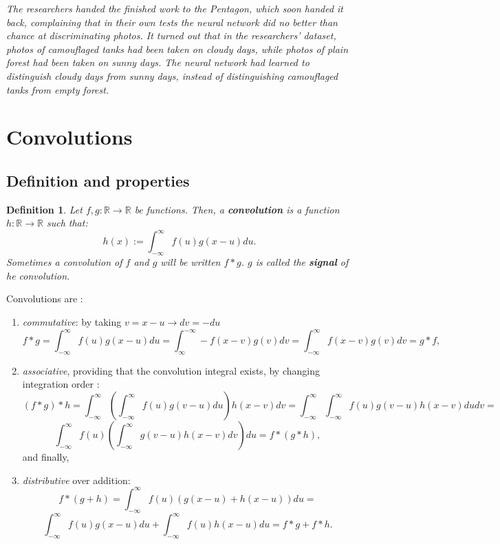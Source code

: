 \documentclass[titlepage]{article}
\theoremstyle{plain}
\newtheorem{definition}{Definition}[section]
\theoremstyle{definition}
\begin{document}
\begin{itemize}
			\begin{center}
				{\small \it The researchers handed the finished work to the Pentagon, which soon handed it back, complaining that in their own tests the neural network did no better than chance at discriminating photos. It turned out that in the researchers' dataset, photos of camouflaged tanks had been taken on cloudy days, while photos of plain forest had been taken on sunny days. The neural network had learned to distinguish cloudy days from sunny days, instead of distinguishing camouflaged tanks from empty forest.}
			\end{center}
		\end{itemize}
		

	\section{Convolutions}\label{Convols}
		\subsection{Definition and properties}
		\theoremstyle{definition}
		\begin{definition}
			Let $f,g:\mathbb{R}\rightarrow\mathbb{R}$ be functions. Then, a \textbf{convolution} is a function $h:\mathbb{R}\rightarrow\mathbb{R}$ such that:
			$$
				h(x) := \int_{-\infty}^{\infty} f(u) g(x-u) du.
			$$
			Sometimes a convolution of $f$ and $g$ will be written $f \ast g$. $g$ is called the \textbf{signal} of he convolution.
		\end{definition}
		Convolutions are \cite{Bracewell}:
		\begin{enumerate}
			\item \textit{commutative}: by taking $v = x-u \rightarrow dv = -du$
			$$
				f \ast g = \int_{-\infty}^{\infty} f(u) g(x-u) du = 
				\int_{\infty}^{-\infty} -f(x-v) g(v) dv =
				\int_{-\infty}^{\infty} f(x-v) g(v) dv =
				g \ast f,
			$$
			\item \textit{associative}, providing that the convolution integral exists, by changing integration order \cite{Nykamp}:
			$$
				(f \ast g) \ast h = 
				\int_{-\infty}^{\infty} (\int_{-\infty}^{\infty} f(u) g(v-u) du) h(x-v) dv =
				\int_{-\infty}^{\infty} \int_{-\infty}^{\infty} f(u) g(v-u) h(x-v) du dv =
				$$ $$
				\int_{-\infty}^{\infty} f(u) (\int_{-\infty}^{\infty}  g(v-u) h(x-v) dv) du =
				f \ast (g \ast h),
			$$ 
			and finally,
			\item \textit{distributive} over addition:
			$$
				f \ast (g + h) =
				\int_{-\infty}^{\infty} f(u) (g(x-u)+h(x-u)) du =
				$$ $$
				\int_{-\infty}^{\infty} f(u)g(x-u)du+\int_{-\infty}^{\infty}f(u)h(x-u) du =
				f \ast g + f \ast h.
			$$
		\end{enumerate}
		
\end{document}
